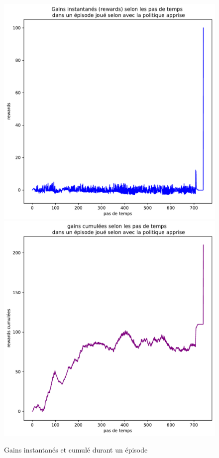 \documentclass[letterpaper,11pt]{article}
\begin{document}
\begin{enumerate}[label=(\alph*)]
\begin{figure}[H]
\begin{center}
\caption{Gains instantanés et cumulé durant un épisode}
\includegraphics[scale=0.45]{gain_par_pas_apres_cv.pdf}\hfill \includegraphics[scale=0.45]{gains_cumules_par_pas_apres_cv.pdf}
\end{center}
\end{figure}

\end{enumerate}
\end{document}

